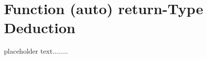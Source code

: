 \newpage
{}
 \section[Deduced Return Type]{Function ({\SecCode auto}) {\SecCode return}-Type Deduction}\label{Function-Return-Type-Deduction}



placeholder text........


